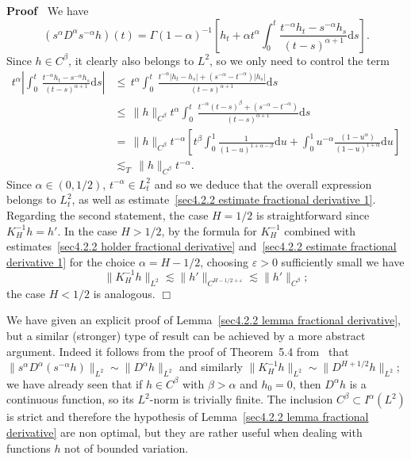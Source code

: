 \documentclass[10pt]{article}
\newcommand{\mathd}{\mathrm{d}}
\newenvironment{proof}{\noindent\textbf{Proof\ }}{\hspace*{\fill}$\Box$\medskip}
\begin{document}
\begin{proof}
  We have
  \[ (s^{\alpha} D^{\alpha} s^{- \alpha} h) (t) = \Gamma (1 - \alpha)^{- 1}
     \left[ h_t + \alpha t^{\alpha} \int_0^t \frac{t^{- \alpha} h_t - s^{-
     \alpha} h_s}{(t - s)^{\alpha + 1}} \mathd s \right] . \]
  Since $h \in C^{\beta}$, it clearly also belongs to $L^2$, so we only need
  to control the term
%  
  \begin{align*}
    t^{\alpha} \left| \int_0^t \, \frac{t^{- \alpha} h_t - s^{- \alpha}
    h_s}{(t - s)^{\alpha + 1}} \mathd s \right| & \leqslant \, t^{\alpha}
    \int_0^t \, \frac{t^{- \alpha} | h_t - h_s | + (s^{- \alpha} - t^{-
    \alpha}) | h_s |}{(t - s)^{\alpha + 1}} \mathd s\\
    & \leqslant \, \| h \|_{C^{\beta}} t^{\alpha} \int_0^t \, \frac{t^{-
    \alpha} (t - s)^{\beta} + (s^{- \alpha} - t^{- \alpha})}{(t - s)^{\alpha +
    1}} \mathd s\\
    & = \, \| h \|_{C^{\beta}} t^{- \alpha} \left[ t^{\beta} \int_0^1
    \frac{1}{(1 - u)^{1 + \alpha - \beta}} \mathd u + \int_0^1 u^{- \alpha} 
    \frac{(1 - u^{\alpha})}{(1 - u)^{1 + \alpha}} \mathd u \right]\\
    & \lesssim_T \, \| h \|_{C^{\beta}} t^{- \alpha} .^{}
  \end{align*}
%  
  Since $\alpha \in (0, 1 / 2)$, $t^{- \alpha} \in L^2_t$ and so we deduce
  that the overall expression belongs to $L^2_t$, as well as
  estimate~{\eqref{sec4.2.2 estimate fractional derivative 1}}. Regarding the
  second statement, the case $H = 1 / 2$ is straightforward since $K^{- 1}_H h
  = h'$. In the case $H > 1 / 2$, by the formula for $K^{- 1}_H$ combined with
  estimates~{\eqref{sec4.2.2 holder fractional derivative}}
  and~{\eqref{sec4.2.2 estimate fractional derivative 1}} for the choice
  $\alpha = H - 1 / 2$, choosing $\varepsilon > 0$ sufficiently small we have
  \[ \| K^{- 1}_H h \|_{L^2} \lesssim \| h' \|_{C^{H - 1 / 2 + \varepsilon}}
     \lesssim \| h' \|_{C^{\beta}} ; \]
  the case $H < 1 / 2$ is analogous.
\end{proof}

\begin{remark}
  We have given an explicit proof of Lemma~\ref{sec4.2.2 lemma fractional
  derivative}, but a similar (stronger) type of result can be achieved by a
  more abstract argument. Indeed it follows from the proof of Theorem~5.4
  from~{\cite{picard}} that $\| s^{\alpha} D^{\alpha} (s^{- \alpha} h)
  \|_{L^2} \sim \| D^{\alpha} h \|_{L^2}$ and similarly $\| K^{- 1}_H h
  \|_{L^2} \sim \| D^{H + 1 / 2} h \|_{L^2}$; we have already seen that if $h
  \in C^{\beta}$ with $\beta > \alpha$ and $h_0 = 0$, then $D^{\alpha} h$ is a
  continuous function, so its $L^2$\mbox{-}norm is trivially finite. The
  inclusion $C^{\beta} \subset I^{\alpha} (L^2)$ is strict and therefore the
  hypothesis of Lemma~\ref{sec4.2.2 lemma fractional derivative} are non
  optimal, but they are rather useful when dealing with functions $h$ not of
  bounded variation.
\end{remark}
\end{document}

